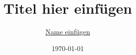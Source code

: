 \documentclass[german,12pt,twoside,a4paper]{report}
\title{Titel hier einfügen}
\author{\href{mailto:deineemailadresse@physik.uni-muenchen.de}{Name einfügen}}
\date{\today}
\begin{document}

\clearpage

\clearpage

\clearpage

%
\clearpage

\tableofcontents

\cleardoublepage



\begin{appendix}
    
    
\end{appendix}
\pagestyle{empty}
\cleardoublepage

\cleardoublepage

\end{document}

